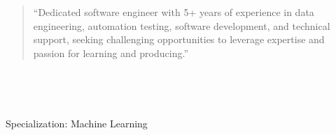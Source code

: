 \documentclass[10pt,a4paper,ragged2e,withhyper]{altacv}
\begin{document}
\begin{paracol}{2}
\switchcolumn


\begin{quote}
``Dedicated software engineer with 5+ years of experience in data engineering, automation testing, software development, and technical support, seeking challenging opportunities to leverage expertise and passion for learning and producing.''
\end{quote}








\\

\divider\smallskip

\\


\divider

\divider


\medskip




Specialization: Machine Learning


\end{paracol}
\end{document}
